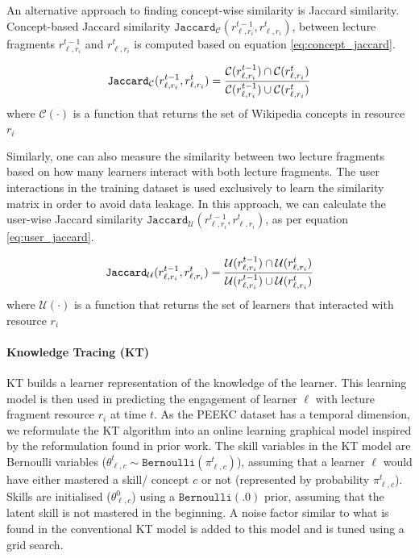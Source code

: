 \documentclass[letterpaper]{article} %
\begin{document}
An alternative approach to finding concept-wise similarity is Jaccard similarity. Concept-based Jaccard similarity $\texttt{Jaccard}_{\mathcal{C}}(r^{t-1}_{\ell,r_i}, r^{t}_{\ell,r_i})$,  between lecture fragments $r^{t-1}_{\ell,r_i}$ and $r^{t}_{\ell,r_i}$ is computed based on equation \ref{eq:concept_jaccard}.

\begin{equation} \label{eq:concept_jaccard}\centering
    \texttt{Jaccard}_{\mathcal{C}}(r^{t-1}_{\ell,r_i}, r^{t}_{\ell,r_i}) =
    \frac{\mathcal{C}(r^{t-1}_{\ell,r_i}) \cap \mathcal{C}(r^{t}_{\ell,r_i})}
    {\mathcal{C}(r^{t-1}_{\ell,r_i}) \cup \mathcal{C}(r^{t}_{\ell,r_i})}
\end{equation}
where $\mathcal{C}(\cdot)$ is a function that returns the set of Wikipedia concepts in resource $r_i$

Similarly, one can also measure the similarity between two lecture fragments based on how many learners interact with both lecture fragments. The user interactions in the training dataset is used exclusively to learn the similarity matrix in order to avoid data leakage. In this approach, we can calculate the user-wise Jaccard similarity $\texttt{Jaccard}_\mathcal{U}(r^{t-1}_{\ell,r_i}, r^{t}_{\ell,r_i})$, as per equation \ref{eq:user_jaccard}.

\begin{equation} \label{eq:user_jaccard}\centering
    \texttt{Jaccard}_\mathcal{U}(r^{t-1}_{\ell,r_i}, r^{t}_{\ell,r_i}) =
    \frac{\mathcal{U}(r^{t-1}_{\ell,r_i}) \cap \mathcal{U}(r^{t}_{\ell,r_i})}
    {\mathcal{U}(r^{t-1}_{\ell,r_i}) \cup \mathcal{U}(r^{t}_{\ell,r_i})}
\end{equation}
where $\mathcal{U}(\cdot)$ is a function that returns the set of learners that interacted with resource $r_i$

\paragraph{Knowledge Tracing (KT)}

KT builds a learner representation of the knowledge of the learner. This learning model is then used in predicting the engagement of learner $\ell$ with lecture fragment resource $r_i$ at time $t$. As the PEEKC dataset has a temporal dimension, we reformulate the KT algorithm into an online learning graphical model inspired by the reformulation found in prior work.  The skill variables in the KT model are Bernoulli variables ($\theta^t_{\ell,c} \sim \texttt{Bernoulli}(\pi^t_{\ell,c})$), assuming that a learner $\ell$ would have either mastered a skill/ concept $c$ or not (represented by probability $\pi^t_{\ell,c}$). Skills are initialised ($\theta^0_{\ell,c}$) using a $\texttt{Bernoulli}(.0)$ prior, assuming that the latent skill is not mastered in the beginning. A noise factor similar to what is found in the conventional KT model is added to this model and is tuned using a grid search.
\end{document}

